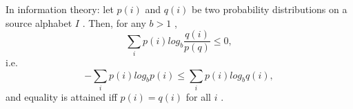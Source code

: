 In information theory: let  $  {p(i) } $  and  $  {q(i) } $  be two
probability distributions on a source alphabet  $ I $ .  Then, for any
 $ b>1 $ ,
 \[ \sum_i p(i) log_b  \frac{q(i)}{p(q)} \leq 0, \] i.e. 
 \[ - \sum_i p(i) log_b p(i) \leq  \sum_i p(i) log_b q(i), \]
and equality is attained iff  $ p(i)=q(i) $  for all  $ i $ .


